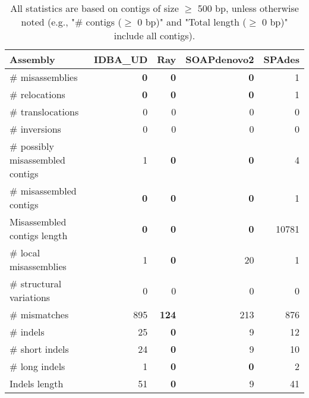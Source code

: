 \documentclass[12pt,a4paper]{article}
\begin{document}
\begin{table}[ht]
\begin{center}
\caption{All statistics are based on contigs of size $\geq$ 500 bp, unless otherwise noted (e.g., "\# contigs ($\geq$ 0 bp)" and "Total length ($\geq$ 0 bp)" include all contigs).}
\begin{tabular}{|l*{4}{|r}|}
\hline
Assembly & IDBA\_UD & Ray & SOAPdenovo2 & SPAdes \\ \hline
\# misassemblies & {\bf 0} & {\bf 0} & {\bf 0} & 1 \\ \hline
\hspace{5mm}\# relocations & {\bf 0} & {\bf 0} & {\bf 0} & 1 \\ \hline
\hspace{5mm}\# translocations & 0 & 0 & 0 & 0 \\ \hline
\hspace{5mm}\# inversions & 0 & 0 & 0 & 0 \\ \hline
\# possibly misassembled contigs & 1 & {\bf 0} & {\bf 0} & 4 \\ \hline
\# misassembled contigs & {\bf 0} & {\bf 0} & {\bf 0} & 1 \\ \hline
Misassembled contigs length & {\bf 0} & {\bf 0} & {\bf 0} & 10781 \\ \hline
\# local misassemblies & 1 & {\bf 0} & 20 & 1 \\ \hline
\# structural variations & 0 & 0 & 0 & 0 \\ \hline
\# mismatches & 895 & {\bf 124} & 213 & 876 \\ \hline
\# indels & 25 & {\bf 0} & 9 & 12 \\ \hline
\hspace{5mm}\# short indels & 24 & {\bf 0} & 9 & 10 \\ \hline
\hspace{5mm}\# long indels & 1 & {\bf 0} & {\bf 0} & 2 \\ \hline
Indels length & 51 & {\bf 0} & 9 & 41 \\ \hline
\end{tabular}
\end{center}
\end{table}
\end{document}
